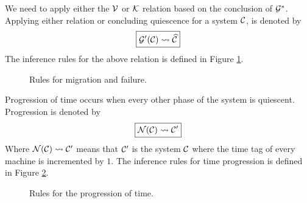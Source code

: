 \newpage
We need to apply either the $\mathcal{V}$ or $\mathcal{K}$ relation based on the conclusion of
$\mathcal{G}^*$. Applying either relation or concluding quiescence for a system $\mathcal{C}$, is
denoted by
\begin{equation*}
\boxed{\mathcal{G}'(\mathcal{C}) \leadsto \widehat{\mathcal{C}}}
\end{equation*}
The inference rules for the above relation is defined in Figure
\ref{fig:rule:mighalt}.

\begin{figure}[!ht]
\caption{Rules for migration and failure.}\label{fig:rule:mighalt}
\end{figure}

Progression of time occurs when every other phase of the system is quiescent.
Progression is denoted by
\begin{equation*}
\boxed{\mathcal{N}(\mathcal{C}) \leadsto \mathcal{C}'}
\end{equation*}
Where $\mathcal{N}(\mathcal{C}) \leadsto \mathcal{C}'$ means that $\mathcal{C}'$ is the system $\mathcal{C}$ where the time
tag of every machine is incremented by $1$. The inference rules for time
progression is defined in Figure \ref{fig:rule:progress}.


\begin{figure}[!ht]
\caption{Rules for the progression of time.}\label{fig:rule:progress}
\end{figure}

